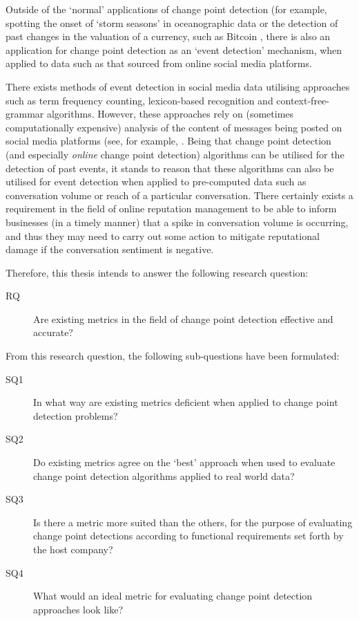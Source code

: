 \documentclass[../main.tex]{subfiles}
\begin{document}
Outside of the `normal' applications of change point detection (for example, spotting the onset of `storm seasons' in oceanographic data \cite{Killick2011} or the detection of past changes in the valuation of a currency, such as Bitcoin \cite{Buntain2014}, there is also an application for change point detection as an `event detection' mechanism, when applied to data such as that sourced from online social media platforms.

There exists methods of event detection in social media data utilising approaches such as term frequency counting, lexicon-based recognition and context-free-grammar algorithms. However, these approaches rely on (sometimes computationally expensive) analysis of the content of messages being posted on social media platforms (see, for example, \citeauthor{Alvanaki2011} \cite{Alvanaki2011}. Being that change point detection (and especially \emph{online} change point detection) algorithms can be utilised for the detection of past events, it stands to reason that these algorithms can also be utilised for event detection when applied to pre-computed data such as conversation volume or reach of a particular conversation. There certainly exists a requirement in the field of online reputation management to be able to inform businesses (in a timely manner) that a spike in conversation volume is occurring, and thus they may need to carry out some action to mitigate reputational damage if the conversation sentiment is negative.

Therefore, this thesis intends to answer the following research question:

\begin{description}
    \item[RQ] Are existing metrics in the field of change point detection effective and accurate?
\end{description}

From this research question, the following sub-questions have been formulated:

\begin{description}
    \item[SQ1] In what way are existing metrics deficient when applied to change point detection problems?
    \item[SQ2] Do existing metrics agree on the `best' approach when used to evaluate change point detection algorithms applied to real world data?
    \item[SQ3] Is there a metric more suited than the others, for the purpose of evaluating change point detections according to functional requirements set forth by the host company?
    \item[SQ4] What would an ideal metric for evaluating change point detection approaches look like?
\end{description}
\end{document}
